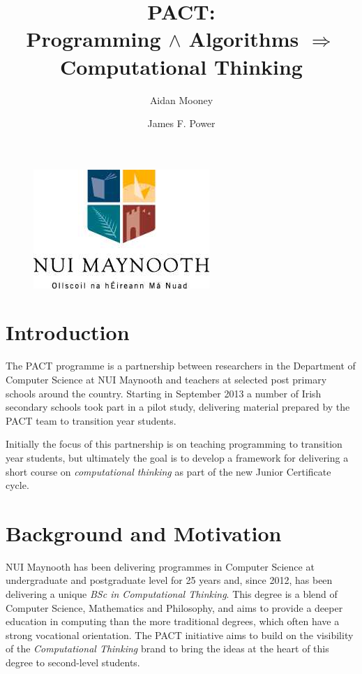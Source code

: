 \documentclass[a4paper]{article}
\begin{document}
\title{PACT: \\ {\large Programming ${\land}$ Algorithms $\Rightarrow$ Computational Thinking}}

\author{Aidan Mooney \and James F. Power}

\begin{figure}\centering
\includegraphics[height=.2\textheight]{nuim_large.jpg}
\end{figure}

\maketitle

\section{Introduction}
The PACT programme is a partnership between researchers in the Department of Computer Science at NUI Maynooth and teachers at selected post primary schools around the country.   Starting in September 2013 a number of Irish secondary schools took part in a pilot study, delivering material prepared by the PACT team to transition year students.

Initially the focus of this partnership is on teaching programming to transition year students, but ultimately the goal is to develop a framework for delivering a short course on \textit{computational thinking} as part of the new Junior Certificate cycle.


\section{Background and Motivation}

NUI Maynooth has been delivering programmes in Computer Science at undergraduate and postgraduate level for 25 years and, since 2012, has been delivering a unique \textit{BSc in Computational Thinking}.  This degree is a blend of Computer Science, Mathematics and Philosophy, and aims to provide a deeper education in computing than the more traditional degrees, which often have a strong vocational orientation.  The PACT initiative aims to build on the visibility of the \textit{Computational Thinking} brand to bring the ideas at the heart of this degree to second-level students.
\end{document}
